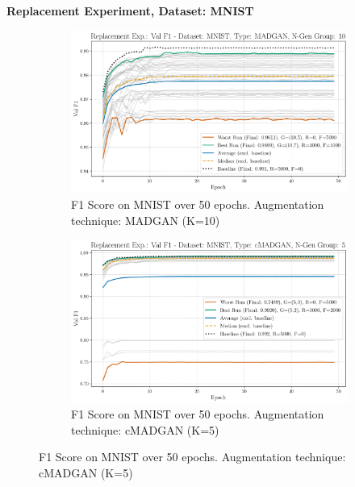 \noindent\textbf{Replacement Experiment, Dataset: MNIST}
\begin{figure}[H]
	\centering
	\begin{subfigure}{.85\textwidth}
		\includegraphics[width=\textwidth]{abb/strat_classifier_performance/MNIST_STRATIFIED_CLASSIFIERS_MADGAN_NEW/replacement_experiments/val_f1_score_MADGAN_MNIST_n_gen_10_all.png}
		\caption{F1 Score on MNIST over 50 epochs. Augmentation technique: MADGAN (K=10)}
        \label{fig:res_replacement_mnist_cmadgan_vs_madgan__madgan}
	\end{subfigure}
	\begin{subfigure}{.85\textwidth}
		\includegraphics[width=\textwidth]{abb/strat_classifier_performance/MNIST_STRATIFIED_CLASSIFIERS_cMADGAN_NEW/replacement_experiments/val_f1_score_cMADGAN_MNIST_n_gen_5_all.png}
		\caption{F1 Score on MNIST over 50 epochs. Augmentation technique: cMADGAN (K=5)}
        \label{fig:res_replacement_mnist_cmadgan_vs_madgan__cmadgan}
	\end{subfigure}
\end{figure}

